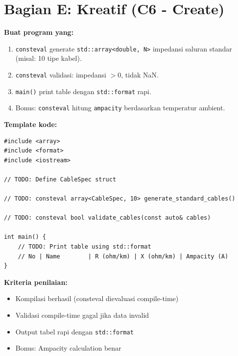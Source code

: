 \documentclass[12pt,a4paper]{article}
\begin{document}
\section*{Bagian E: Kreatif (C6 - Create)}

\begin{tcolorbox}[colback=UBgold!10, colframe=UBgold, title=\textbf{E1. Project Mini: Compile-Time Impedance Table (C6: Create)}]
\textbf{Buat program yang:}

\begin{enumerate}
  \item \texttt{consteval} generate \texttt{std::array<double, N>} impedansi saluran standar (misal: 10 tipe kabel).
  \item \texttt{consteval} validasi: impedansi $> 0$, tidak NaN.
  \item \texttt{main()} print table dengan \texttt{std::format} rapi.
  \item Bonus: \texttt{consteval} hitung \texttt{ampacity} berdasarkan temperatur ambient.
\end{enumerate}

\textbf{Template kode:}

\begin{lstlisting}
#include <array>
#include <format>
#include <iostream>

// TODO: Define CableSpec struct

// TODO: consteval array<CableSpec, 10> generate_standard_cables()

// TODO: consteval bool validate_cables(const auto& cables)

int main() {
    // TODO: Print table using std::format
    // No | Name        | R (ohm/km) | X (ohm/km) | Ampacity (A)
}
\end{lstlisting}

\vspace{1cm}
\textbf{Kriteria penilaian:}
\begin{itemize}
  \item[\square] Kompilasi berhasil (consteval dievaluasi compile-time)
  \item[\square] Validasi compile-time gagal jika data invalid
  \item[\square] Output tabel rapi dengan \texttt{std::format}
  \item[\square] Bonus: Ampacity calculation benar
\end{itemize}
\end{tcolorbox}
\end{document}
